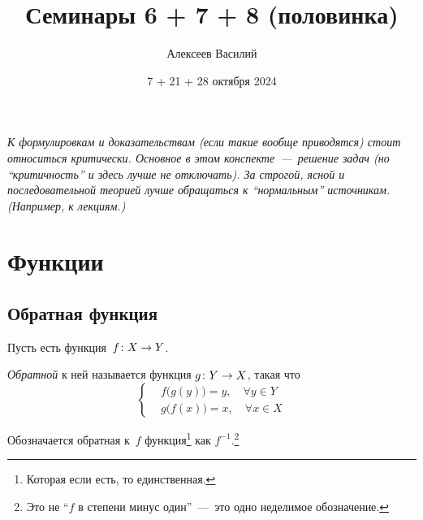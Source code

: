 \documentclass[a4paper,12pt]{article}
\author{Алексеев Василий}
\title{Семинары 6 + 7 + 8 (половинка)}
\date{7 + 21 + 28 октября 2024}
\begin{document}
  \maketitle
  
  \tableofcontents

  \thispagestyle{empty}
  
  \newpage
  
  
  
  \vspace*{\fill}
  
  \noindent
  \emph{
    К формулировкам и доказательствам (если такие вообще приводятся) стоит относиться критически.
    Основное в этом конспекте~---~решение задач (но ``критичность'' и здесь лучше не отключать).
    За строгой, ясной и последовательной теорией лучше обращаться к ``нормальным'' источникам.
    (Например, к лекциям.)
  }
  
  \vspace*{\fill}
  
  \thispagestyle{empty}
  
  \newpage
  
  


  \section{Функции}
  


  \subsection{Обратная функция}
  
  \begin{definition}
    Пусть есть функция~$f\colon X \hm\to Y$.
    
    \emph{Обратной} к ней называется функция $g\colon Y \hm\to X$, такая что
    \[
      \left\{\begin{aligned}
        &f\bigl(g(y)\bigr) = y,\quad \forall y \in Y\\
        &g\bigl(f(x)\bigr) = x,\quad \forall x \in X
      \end{aligned}\right.
    \]
    
    Обозначается обратная к~$f$ функция\footnote{
      Которая если есть, то единственная.
    } как $f^{-1}$.\footnote{
      Это не ``$f$ в степени минус один''~---~это одно неделимое обозначение.
    }
  \end{definition}
  
\end{document}
